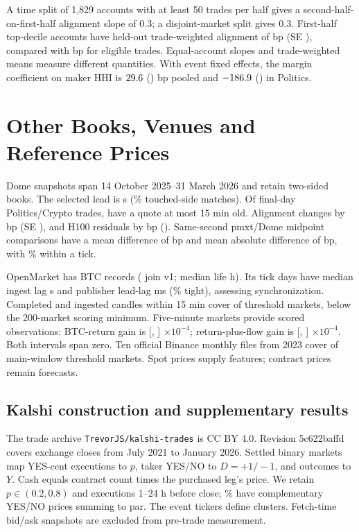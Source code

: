 \documentclass[sigconf,anonymous,nonacm,balance=false]{acmart}
\newcommand{\tabstyle}{\setlength{\tabcolsep}{3pt}}
\begin{document}
\label{app:makers}
A time split of 1,829 accounts with at least 50 trades per half gives a second-half-on-first-half alignment slope of 0.3; a disjoint-market split gives 0.3. First-half top-decile accounts have held-out trade-weighted alignment of \AccountTop{} bp (SE \AccountSE), compared with \AccountPop{} bp for eligible trades. Equal-account slopes and trade-weighted means measure different quantities. With event fixed effects, the margin coefficient on maker HHI is $29.6$ (\EdHHIAllSE) bp pooled and $-186.9$ (\EdHHIPolSE) in Politics.

\section{Other Books, Venues and Reference Prices}
\label{app:external}
Dome snapshots span 14 October 2025--31 March 2026 and retain two-sided books. The selected lead is \DOneLead{} s (\DOneTouch\% touched-side matches). Of \DOneWin{} final-day Politics/Crypto trades, \DOnePre{} have a quote at most 15 min old. Alignment changes by \DOneInfo{} bp (SE \DOneInfoSE), and H100 residuals by \DOneRes{} bp (\DOneResSE). Same-second pmxt/Dome midpoint comparisons have a mean difference of \DOnePmMean{} bp and mean absolute difference of \DOnePmAbs{} bp, with \DOnePmTick\% within a tick.
\begin{table}[!htbp]
\centering
\caption{Dome quote minus transaction midpoint estimates. Alignment and residual columns use their respective paired samples. Probability bp; event-cluster SEs.}
\label{tab:extdome}
\tabstyle

\end{table}

OpenMarket has \ExtMeta{} BTC records (\ExtInV{} join v1; median life \ExtLife{} h). Its \ExtTickDays{} tick days have median ingest lag \ExtLag{} s and publisher lead-lag \ExtLead{} ms (\ExtTight\% tight), assessing synchronization. Completed and ingested candles within 15 min cover \ExtBtcHit{} of \ExtBtcN{} threshold markets, below the 200-market scoring minimum. Five-minute markets provide \ExtShort{} scored observations: BTC-return gain is \ExtRetG{} [\ExtRetLo, \ExtRetHi] $\times10^{-4}$; return-plus-flow gain is \ExtFlowG{} [\ExtFlowLo, \ExtFlowHi] $\times10^{-4}$. Both intervals span zero. Ten official Binance monthly files from 2023 cover \ExtDsixHit{} of \ExtDsixN{} main-window threshold markets. Spot prices supply features; contract prices remain forecasts.

\subsection{Kalshi construction and supplementary results}
\label{app:kalshi}
The trade archive \nolinkurl{TrevorJS/kalshi-trades} is CC BY 4.0. Revision 5c622baffd covers exchange closes from July 2021 to January 2026. Settled binary markets map YES-cent executions to $p$, taker YES/NO to $D=+1/-1$, and outcomes to $Y$. Cash equals contract count times the purchased leg's price. We retain $p\in(0.2,0.8)$ and executions 1--24 h before close; \KalCents\% have complementary YES/NO prices summing to par. The \KalEvents{} event tickers define clusters. Fetch-time bid/ask snapshots are excluded from pre-trade measurement.
\end{document}
